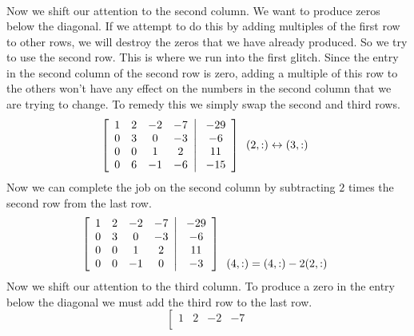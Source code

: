 \begin{example}
{\[\begin{array}{c}
\end{array}
\]
Now we shift our attention to the second column. We want to produce
zeros below the diagonal. If we attempt to do this by adding multiples
of the first row to other rows, we will destroy the zeros that we have
already produced. So we try to use the second row. This is where we
run into the first glitch. Since the entry in the second column of the second row
is zero, adding a multiple of this row to the others won't have any
effect on the numbers in the second column that we are trying to
change. To remedy this we simply swap the second and third rows.
\[
\left[
\begin{array}{cccc}
1&2&-2&-7 \\
0&3&0&-3 \\
0&0&1&2 \\
0&6&-1&-6
\end{array} \right| \left.
\begin{array}{c}
-29 \\ -6 \\ 11 \\ -15 
\end{array}
\right]
\begin{array}{c} 
 \\(2,:)\leftrightarrow(3,:)\\ \hfill
\end{array}
\]
Now we can complete the job on the second column by subtracting $2$
times the second row from the last row.
\[
\left[
\begin{array}{cccc}
1&2&-2&-7 \\
0&3&0&-3 \\
0&0&1&2 \\
0&0&-1&0
\end{array} \right| \left.
\begin{array}{c}
-29 \\ -6 \\ 11 \\ -3 
\end{array}
\right]
\begin{array}{c} 
 \\ \\ \\ (4,:)=(4,:)-2(2,:) \hfill
\end{array}
\]
Now we shift our attention to the third column. To produce a zero in the
entry below the diagonal we must add the third row to the last row.
\[
\left[
\begin{array}{cccc}
1&2&-2&-7 \\

\end{array}\]}
\end{example}
